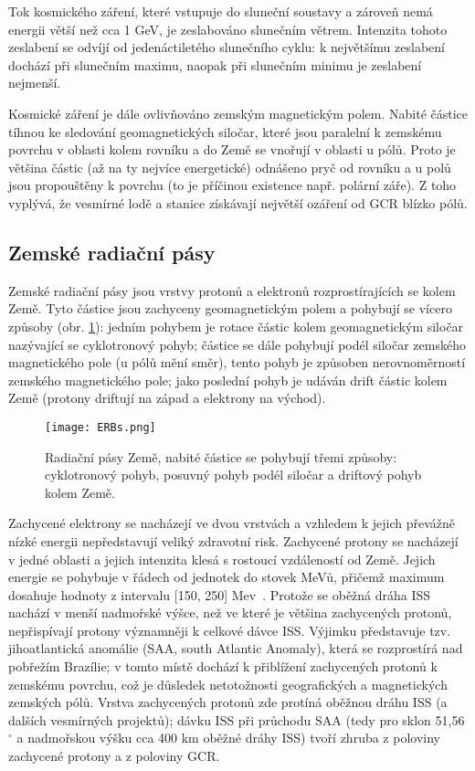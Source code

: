 Tok kosmického záření, které vstupuje do sluneční soustavy a zároveň nemá energii větší než cca 1 GeV, je zeslabováno slunečním větrem. Intenzita tohoto zeslabení se odvíjí od jedenáctiletého slunečního cyklu: k největšímu zeslabení dochází při slunečním maximu, naopak při slunečním minimu je zeslabení nejmenší. 

Kosmické záření je dále ovlivňováno zemským magnetickým polem. Nabité částice tíhnou ke sledování geomagnetických siločar, které jsou paralelní k zemskému povrchu v oblasti kolem rovníku a do Země se vnořují v oblasti u pólů. Proto je většina částic (až na ty nejvíce energetické) odnášeno pryč od rovníku a u polů jsou propouštěny k povrchu (to je příčinou existence např. polární záře). Z toho vyplývá, že vesmírné lodě a stanice získávají největší ozáření od GCR blízko pólů.

\subsection{Zemské radiační pásy}
Zemské radiační pásy jsou vrstvy protonů a elektronů rozprostírajících se kolem Země. Tyto částice jsou zachyceny geomagnetickým polem a pohybují se vícero způsoby (obr. \ref{fig:ERBs}): jedním pohybem je rotace částic kolem geomagnetickým siločar nazývající se cyklotronový pohyb; částice se dále pohybují podél siločar zemského magnetického pole (u pólů mění směr), tento pohyb je způsoben nerovnoměrností zemského magnetického pole; jako poslední pohyb je udáván drift částic kolem Země (protony driftují na západ a elektrony na východ).
\begin{figure}[H]
  \centering
  \texttt{[image: ERBs.png]}
  \caption{Radiační pásy Země, nabité částice se pohybují třemi způsoby: cyklotronový pohyb, posuvný pohyb podél siločar a driftový pohyb kolem Země. \cite{benton}}
  \label{fig:ERBs}
\end{figure}

Zachycené elektrony se nacházejí ve dvou vrstvách a vzhledem k jejich převážně nízké energii nepředstavují veliký zdravotní risk. Zachycené protony se nacházejí v jedné oblasti a jejich intenzita klesá s rostoucí vzdáleností od Země. Jejich energie se pohybuje v řádech od jednotek do stovek MeVů, přičemž maximum dosahuje hodnoty z intervalu [150, 250] Mev~\cite{benton}. Protože se oběžná dráha ISS nachází v menší nadmořské výšce, než ve které je většina zachycených protonů, nepřispívají protony významněji k celkové dávce ISS. Výjimku představuje tzv. jihoatlantická anomálie (SAA, south Atlantic Anomaly), která se rozprostírá nad pobřežím Brazílie; v tomto místě dochází k přiblížení zachycených protonů k zemskému povrchu, což je důsledek netotožnosti geografických a magnetických zemských pólů.
Vrstva zachycených protonů zde protíná oběžnou dráhu ISS (a dalších vesmírných projektů); dávku ISS při průchodu SAA (tedy pro sklon 51,56$^\circ$ a nadmořskou výšku cca 400 km oběžné dráhy ISS)  tvoří zhruba z poloviny zachycené protony a z poloviny GCR.~\cite{benton}

